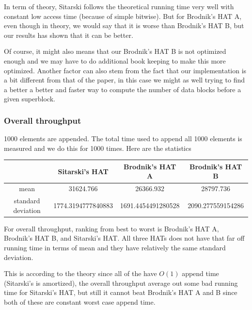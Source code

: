 \documentclass{article} %
\begin{document}
    In term of theory, Sitarski follows the theoretical running time very well with constant low access time (because of simple bitwise).
    But for Brodnik's HAT A, even though in theory, we would say that it is worse than Brodnik's HAT B, but our results has shown that it can be better.

    Of course, it might also means that our Brodnik's HAT B is not optimized enough and we may have to do additional book keeping to make this more optimized.
    Another factor can also stem from the fact that our implementation is a bit different from that of the paper, in this case we might as well trying to find a better
    a better and faster way to compute the number of data blocks before a given superblock.

    \subsubsection*{Overall throughput}
    1000 elements are appended. The total time used to append all 1000 elements is measured and we do this for 1000 times.
    Here are the statistics
    \begin{center}
        \begin{tabular}{|c|c|c|c|}\hline
        & Sitarski's HAT & Brodnik's HAT A & Brodnik's HAT B\\\hline
        mean &  31624.766 & 26366.932 & 28797.736\\\hline
        standard deviation & 1774.3194777840883  & 1691.4454491280528 & 2090.277559154286\\\hline
        \end{tabular}
    \end{center}
    For overall throughput, ranking from best to worst is Brodnik's HAT A, Brodnik's HAT B, and Sitarski's HAT.
    All three HATs does not have that far off running time in terms of mean and they have relatively the same standard deviation.

    This is according to the theory since all of the have $O(1)$ append time (Sitarski's is amortized), the overall throughput
    average out some bad running time for Sitarski's HAT, but still it cannot beat Brodnik's HAT A and B since both of these are constant worst case append time.
\end{document}

